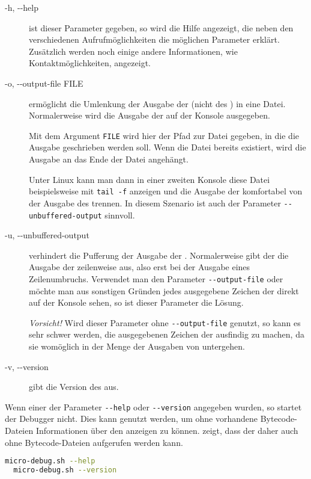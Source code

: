 \begin{description}
\item[-h, -{}-help]
  ist dieser Parameter gegeben, so wird die Hilfe angezeigt, die neben den verschiedenen Aufrufmöglichkeiten die möglichen Parameter erklärt. Zusätzlich werden noch einige andere Informationen, wie Kontaktmöglichkeiten, angezeigt.

\item[-o, -{}-output-file FILE]
  ermöglicht die Umlenkung der Ausgabe der \mic (nicht des \md) in eine Datei. Normalerweise wird die Ausgabe der \mic auf der Konsole ausgegeben.

  Mit dem Argument \texttt{FILE} wird hier der Pfad zur Datei gegeben, in die die Ausgabe geschrieben werden soll. Wenn die Datei bereits existiert, wird die Ausgabe an das Ende der Datei angehängt.

  Unter Linux kann man dann in einer zweiten Konsole diese Datei beispielsweise mit \texttt{tail -f} anzeigen und die Ausgabe der \mic komfortabel von der Ausgabe des \md trennen. In diesem Szenario ist auch der Parameter \texttt{-{}-unbuffered-output} sinnvoll.
\item[-u, -{}-unbuffered-output]
  verhindert die Pufferung der Ausgabe der \mic. Normalerweise gibt der \md die Ausgabe der \mic zeilenweise aus, also erst bei der Ausgabe eines Zeilenumbruchs. Verwendet man den Parameter \texttt{-{}-output-file} oder möchte man aus sonstigen Gründen jedes ausgegebene Zeichen der \mic direkt auf der Konsole sehen, so ist dieser Parameter die Lösung.

  \emph{Vorsicht!} Wird dieser Parameter ohne \texttt{-{}-output-file} genutzt, so kann es sehr schwer werden, die ausgegebenen Zeichen der \mic ausfindig zu machen, da sie womöglich in der Menge der Ausgaben von \md untergehen.

\item[-v, -{}-version]
  gibt die Version des \md aus.
\end{description}

Wenn einer der Parameter \texttt{-{}-help} oder \texttt{-{}-version} angegeben wurden, so startet der Debugger nicht. Dies kann genutzt werden, um ohne vorhandene Bytecode-Dateien Informationen über den \md anzeigen zu können.  zeigt, dass der \md daher auch ohne Bytecode-Dateien aufgerufen werden kann.

\begin{lstlisting}[language=sh,caption={Aufruf des \md ohne Start -- Konsolenversion},label=\lstlbl{aufrufe-ohne-start}]
  micro-debug.sh --help
  micro-debug.sh --version
\end{lstlisting}

